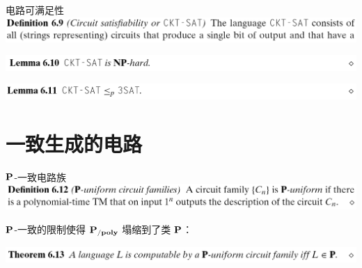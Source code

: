 \documentclass[UTF8,aspectratio=169,mathserif]{beamer}
\begin{document}
	\begin{frame}{电路可满足性}
		\includegraphics[width=\linewidth]{../../5 & 6/note.assets/image-20210427145455454.png}\newline
		
		\includegraphics[width=\linewidth]{../../5 & 6/note.assets/image-20210427145611392.png}\newline
		
		\includegraphics[width=\linewidth]{../../5 & 6/note.assets/image-20210427145621708.png}
	\end{frame}
	
	\section{一致生成的电路}
	\begin{frame}{$\bf P$-一致电路族}
		\includegraphics[width=\linewidth]{../../5 & 6/note.assets/image-20210427150551518.png}\newline
		
		$\bf P$-一致的限制使得 $\bf P_{/poly}$ 塌缩到了类 $\bf P$：\newline
		
		\includegraphics[width=\linewidth]{../../5 & 6/note.assets/image-20210427151158414.png}
	\end{frame}
	
\end{document}

